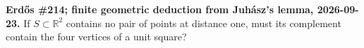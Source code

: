 \textbf{Erd\H{o}s \#214; finite geometric deduction from Juh\'asz's lemma, 2026-09-23.}
If $S\subset\mathbb R^2$ contains no pair of points at distance one, must its complement contain the four vertices of a unit square?

